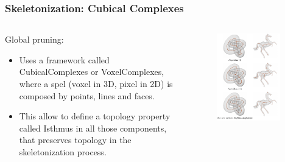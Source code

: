 \documentclass[9pt]{beamer}
\begin{document}
\begin{frame}[t]
  \frametitle{Skeletonization: Cubical Complexes}
  \begin{columns}[T,onlytextwidth]
    \begin{exampleblock}{Global pruning:}
      \begin{itemize}
        \item Uses a framework called CubicalComplexes or VoxelComplexes, where a spel (voxel in 3D, pixel in 2D) is composed by points, lines and faces.
        \item This allow to define a topology property called Isthmus in all those components, that preserves topology in the skeletonization process.
      \end{itemize}
    \end{exampleblock}
    \begin{figure}[h]
      \includegraphics[width=0.9\textwidth]{./Figures/skeleton/thinningCouprie.png}
    \end{figure}
  \end{columns}
\end{frame}
\end{document}
